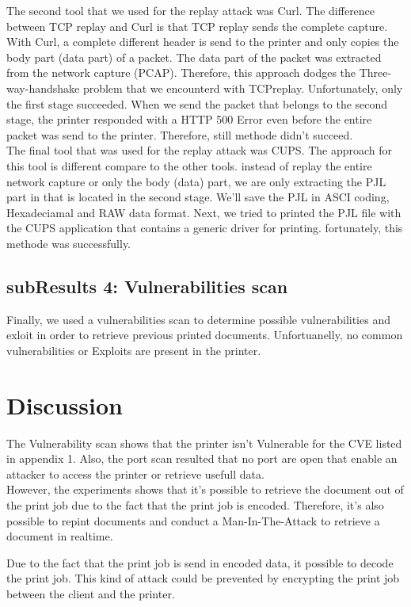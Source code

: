 \documentclass[a4paper]{article}
\begin{document}
The second tool that we used for the replay attack was Curl. The
difference between TCP replay and Curl is that TCP replay sends the
complete capture. With Curl, a complete different header is send to the
printer and only copies the body part (data part) of a packet. The data
part of the packet was extracted from the network capture (PCAP).
Therefore, this approach  dodges the  Three-way-handshake problem that we
encounterd with TCPreplay. Unfortunately, only the first stage succeeded.
When we send the packet that belongs to the second stage, the printer
responded with a HTTP 500 Error even before the entire packet was send to
the printer. Therefore, still methode didn't succeed.\\

The final tool that was used for the replay attack was CUPS. The approach
for this tool is different compare to the other tools. instead of replay
the entire network capture or only the body (data) part, we are only
extracting the PJL part in that is located in the second stage. We'll save
the PJL in ASCI coding, Hexadeciamal and RAW data format. Next, we tried
to printed the PJL file with the CUPS application that contains a generic
driver for printing. fortunately, this methode was successfully.

\subsection{subResults 4: Vulnerabilities scan }
Finally, we used a vulnerabilities scan to determine  possible vulnerabilities and exloit in order to retrieve previous printed documents. Unfortuanelly, no common vulnerabilities or Exploits are present in the printer.


\section{Discussion} %
\label{Discussion}
The Vulnerability scan shows that the printer isn't Vulnerable for the CVE listed in appendix 1. Also, the port scan resulted that no port are open that enable an attacker to access the printer or retrieve usefull data. 
\\
However, the experiments shows that it's possible to retrieve the document out of the print job due to the fact that the print job is encoded. Therefore, it's also possible to repint documents and conduct a Man-In-The-Attack to retrieve a document in realtime.

Due to the fact that the print job is send in encoded data, it possible to decode the print job. This kind of attack could be prevented by encrypting the print job between the client and the printer.
\end{document}
